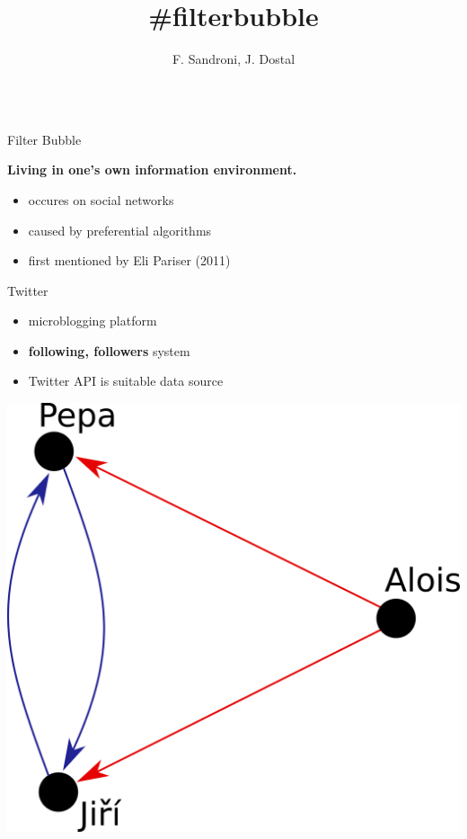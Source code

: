 \documentclass{beamer}
\title{\#filterbubble}
\author[dostal.jakub@outlook.com]{F. Sandroni, J. Dostal}
\begin{document}
\begin{frame}[fragile]
\begin{columns}[T]
\begin{column}{.33\textwidth}

\begin{block}{Filter Bubble}
    \center
    \begin{large}\textbf{Living in one's own information environment.}\end{large}
    \vspace{0.8cm}
    \begin{itemize}
        \item occures on social networks
        \item caused by preferential algorithms
        \item first mentioned by Eli Pariser (2011)
    \end{itemize}
\end{block}
\begin{block}{Twitter}
	\begin{itemize}
		\item microblogging platform
        \item \textbf{following, followers} system
		\item Twitter API is suitable data source
	\end{itemize}
	\center
	\includegraphics[scale=0.55]{./Pics/pepa.png}

\end{block}
\end{column}
\end{columns}
\end{frame}
\end{document}
